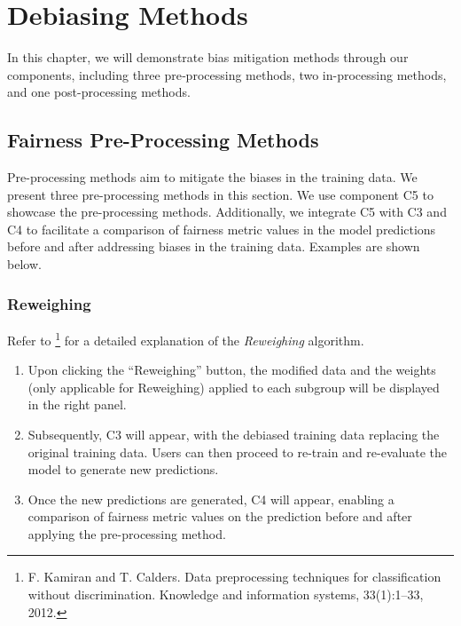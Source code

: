 \section{Debiasing Methods}

\par In this chapter, we will demonstrate bias mitigation methods through our components, including three pre‐processing methods, two in-processing methods, and one post-processing methods.
 
\subsection{Fairness Pre-Processing Methods}
\par Pre-processing methods aim to mitigate the biases in the training data. 
We present three pre-processing methods in this section. We use component C5 to showcase the pre-processing methods. 
Additionally, we integrate C5 with C3 and C4 to facilitate a comparison of fairness metric values in the model predictions before and after addressing biases in the training data.
Examples are shown below. 

\subsubsection{Reweighing}
Refer to 
\footnote{F. Kamiran and T. Calders. Data preprocessing techniques for classification without discrimination. Knowledge and information systems, 33(1):1–33, 2012.}
for a detailed explanation of the \emph{Reweighing} algorithm.

\begin{enumerate}
    \item Upon clicking the “Reweighing” button, the modified data and the weights (only applicable for Reweighing) applied to each subgroup will be displayed in the right panel.
    \item Subsequently, C3 will appear, with the debiased training data replacing the original training data. Users can then proceed to re-train and re-evaluate the model to generate new predictions.
    \item Once the new predictions are generated, C4 will appear, enabling a comparison of fairness metric values on the prediction before and after applying the pre-processing method.
\end{enumerate}

\begin{VCSet}
    \begin{visualComponent}
    \end{visualComponent}
    
    \begin{visualComponent}
    \end{visualComponent}

    \begin{visualComponent}
    \end{visualComponent}
\end{VCSet}


